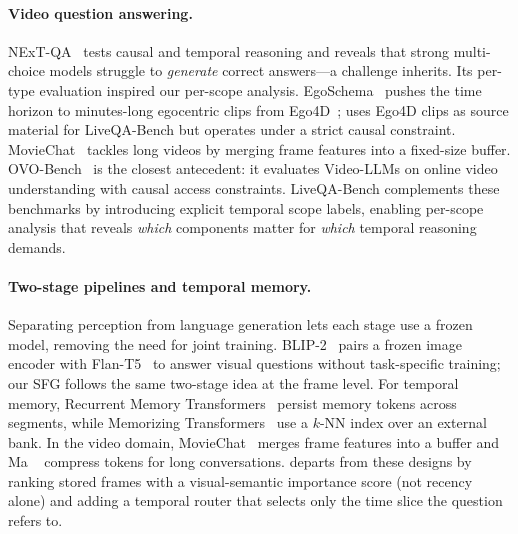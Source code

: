 \paragraph{Video question answering.}
NExT-QA~\cite{xiao2021nextqa} tests causal and temporal reasoning and reveals that strong multi-choice models struggle to \emph{generate} correct answers---a challenge \ours inherits.
Its per-type evaluation inspired our per-scope analysis.
EgoSchema~\cite{mangalam2023egoschema} pushes the time horizon to minutes-long egocentric clips from Ego4D~\cite{grauman2022ego4d}; \ours uses Ego4D clips as source material for LiveQA-Bench but operates under a strict causal constraint.
MovieChat~\cite{song2024moviechat} tackles long videos by merging frame features into a fixed-size buffer.
OVO-Bench~\cite{li2025ovobench} is the closest antecedent: it evaluates Video-LLMs on online video understanding with causal access constraints.
LiveQA-Bench complements these benchmarks by introducing explicit temporal scope labels, enabling per-scope analysis that reveals \emph{which} components matter for \emph{which} temporal reasoning demands.

\paragraph{Two-stage pipelines and temporal memory.}
Separating perception from language generation lets each stage use a frozen model, removing the need for joint training.
BLIP-2~\cite{li2023blip2} pairs a frozen image encoder with Flan-T5~\cite{chung2022flanT5} to answer visual questions without task-specific training; our SFG follows the same two-stage idea at the frame level.
For temporal memory, Recurrent Memory Transformers~\cite{bulatov2022recurrent} persist memory tokens across segments, while Memorizing Transformers~\cite{wu2022memorizing} use a $k$-NN index over an external bank.
In the video domain, MovieChat~\cite{song2024moviechat} merges frame features into a buffer and Ma \etal~\cite{ma2023livelylivechat} compress tokens for long conversations.
\ours departs from these designs by ranking stored frames with a visual-semantic importance score (not recency alone) and adding a temporal router that selects only the time slice the question refers to.

